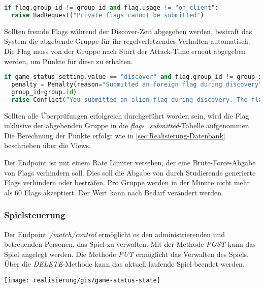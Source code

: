 \begin{lstlisting}[language=Python, frame=single, caption={GIS Abgabe privater Flags verhindern}, captionpos=b, label={lst:gis-prevent-submitting-private-flags}]
if flag.group_id != group_id and flag.usage != "on_client":
  raise BadRequest("Private flags cannot be submitted")
\end{lstlisting}

Sollten fremde Flags während der Discover-Zeit abgegeben werden, bestraft das System die abgebende Gruppe für ihr regelverletzendes Verhalten automatisch. Die Flag muss von der Gruppe nach Start der Attack-Time erneut abgegeben werden, um Punkte für diese zu erhalten.

\begin{lstlisting}[language=Python, frame=single, caption={GIS Strafe für das Abgeben fremder Flags}, captionpos=b, label={lst:gis-flag-penatly}]
if game_status_setting.value == "discover" and flag.group_id != group_id:
  penalty = Penalty(reason="Submitted an foreign flag during discovery", points=penalty_points,
  group_id=group.id)
  raise Conflict("You submitted an alien flag during discovery. The flag is not accepted. You'll be punished.")
\end{lstlisting}

Sollten alle Überprüfungen erfolgreich durchgeführt worden sein, wird die Flag inklusive der abgebenden Gruppe in die \textit{flags\_submitted}-Tabelle aufgenommen. Die Berechnung der Punkte erfolgt wie in \autoref{sec:Realisierung-Datenbank} beschrieben über die Views.

Der Endpoint ist mit einem Rate Limiter versehen, der eine Brute-Force-Abgabe von Flags verhindern soll. Dies soll die Abgabe von durch Studierende generierte Flags verhindern oder bestrafen. Pro Gruppe werden in der Minute nicht mehr als 60 Flags akzeptiert. Der Wert kann nach Bedarf verändert werden.

\subsubsection{Spielsteuerung}
Der Endpoint \textit{/match/control} ermöglicht es den administrierenden und betreuenden Personen, das Spiel zu verwalten. Mit der Methode \textit{POST} kann das Spiel angelegt werden. Die Methode \textit{PUT} ermöglicht das Verwalten des Spiels. Über die \textit{DELETE}-Methode kann das aktuell laufende Spiel beendet werden.

\begin{center}
	\texttt{[image: realisierung/gis/game-status-state]}
	\label{fig:realisierung-gis-game-status}
\end{center}

